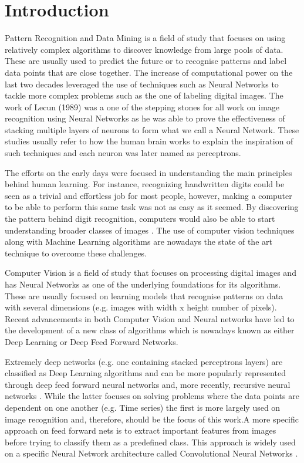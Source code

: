 \chapter{Introduction}
Pattern Recognition and Data Mining is a field of study that focuses on using relatively complex algorithms to discover knowledge from large pools of data. These are usually used to predict the future or to recognise patterns and label data points that are close together. The increase of computational power on the last two decades leveraged the use of techniques such as Neural Networks \cite{bishop1995neural} to tackle more complex problems such as the one of labeling digital images. The work of Lecun (1989) \cite{lecunn89} was a one of the stepping stones for all work on image recognition using Neural Networks as he was able to prove the effectiveness of stacking multiple layers of neurons to form what we call a Neural Network. These studies usually refer to how the human brain works to explain the inspiration of such techniques and each neuron was later named as perceptrons.

The efforts on the early days were focused in understanding the main principles behind human learning. For instance, recognizing handwritten digits could be seen as a trivial and effortless job for most people, however, making a computer to be able to perform this same task was not as easy as it seemed. By discovering the pattern behind digit recognition, computers would also be able to start understanding broader classes of images \cite{krizhevsky2012}. The use of computer vision techniques along with Machine Learning algorithms are nowadays the state of the art technique to overcome these challenges.

Computer Vision is a field of study that focuses on processing digital images and has Neural Networks as one of the underlying foundations for its algorithms. These are usually  focused on learning models that recognise patterns on data with several dimensions (e.g. images with width x height number of pixels). Recent advancements in both Computer Vision and Neural networks have led to the development of a new class of algorithms which is nowadays known as either Deep Learning or Deep Feed Forward Networks.

Extremely deep networks (e.g. one containing stacked perceptrons layers) are classified as Deep Learning algorithms and can be more popularly represented through deep feed forward neural networks \cite{hornik1989multilayer} and, more recently, recursive neural networks \cite{goller1996learning}. While the latter focuses on solving problems where the data points are dependent on one another (e.g. Time series) the first is more largely used on image recognition and, therefore, should be the focus of this work.A more specific approach on feed forward nets is to extract important features from images before trying to classify them as a predefined class. This approach is widely used on a specific Neural Network architecture called Convolutional Neural Networks \cite{matsugu2003subject}.


